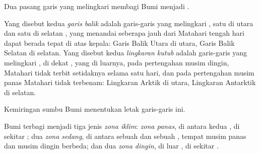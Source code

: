 Dua pasang garis yang melingkari  membagi Bumi menjadi .

\begin{definition}\label{def:g5:weather-and-climate:tropics}
Yang disebut kedua \emph{garis balik} adalah garis-garis
yang melingkari , satu di utara dan satu di selatan ,
yang menandai seberapa jauh dari  Matahari tengah hari dapat
berada tepat di atas kepala: Garis Balik Utara di utara, Garis Balik
Selatan di selatan. Yang disebut kedua \emph{lingkaran
kutub} adalah garis-garis yang melingkari ,
di dekat , yang di luarnya, pada pertengahan musim dingin, Matahari
tidak terbit setidaknya selama satu hari, dan pada pertengahan musim panas
Matahari tidak terbenam: Lingkaran Arktik di utara, Lingkaran Antarktik di
selatan.
\end{definition}

Kemiringan sumbu Bumi menentukan letak garis-garis ini.

\begin{definition}\label{def:g5:weather-and-climate:climate-zone}
Bumi terbagi menjadi tiga jenis \emph{zona iklim}: \emph{zona panas}, di antara kedua , di sekitar ;
dua \emph{zona sedang}, di antara sebuah  dan sebuah , tempat musim panas dan musim dingin berbeda; dan dua \emph{zona
dingin}, di luar , di sekitar .
\end{definition}

